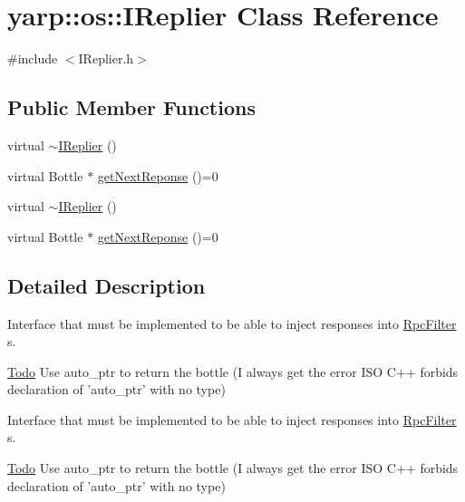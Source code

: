\hypertarget{classyarp_1_1os_1_1_i_replier}{
\section{yarp::os::IReplier Class Reference}
\label{classyarp_1_1os_1_1_i_replier}
}


{\ttfamily \#include $<$IReplier.h$>$}\subsection*{Public Member Functions}
\begin{DoxyCompactItemize}
\item 
virtual \hyperlink{classyarp_1_1os_1_1_i_replier_a197fe86812f17bc97cc7bf1b94473e84}{$\sim$IReplier} ()
\item 
virtual Bottle $\ast$ \hyperlink{classyarp_1_1os_1_1_i_replier_a6b14c9b19625876caa5843b15537dcbd}{getNextReponse} ()=0
\item 
virtual \hyperlink{classyarp_1_1os_1_1_i_replier_a197fe86812f17bc97cc7bf1b94473e84}{$\sim$IReplier} ()
\item 
virtual Bottle $\ast$ \hyperlink{classyarp_1_1os_1_1_i_replier_a6b14c9b19625876caa5843b15537dcbd}{getNextReponse} ()=0
\end{DoxyCompactItemize}


\subsection{Detailed Description}
Interface that must be implemented to be able to inject responses into \hyperlink{classyarp_1_1os_1_1_rpc_filter}{RpcFilter} s.

\begin{Desc}
\item[\hyperlink{todo__todo000007}{Todo}]Use auto\_\-ptr to return the bottle (I always get the error ISO C++ forbids declaration of 'auto\_\-ptr' with no type) \end{Desc}


Interface that must be implemented to be able to inject responses into \hyperlink{classyarp_1_1os_1_1_rpc_filter}{RpcFilter} s.

\begin{Desc}
\item[\hyperlink{todo__todo000017}{Todo}]Use auto\_\-ptr to return the bottle (I always get the error ISO C++ forbids declaration of 'auto\_\-ptr' with no type) \end{Desc}


